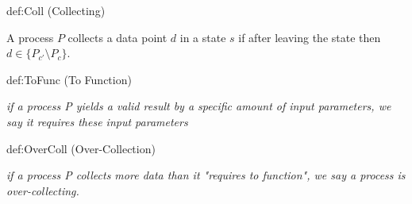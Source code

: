 

\begin{definition}{def:Coll}{}
(Collecting)

A process $P$ collects a data point $d$ in a state $s$ if after leaving the state then $d \in \{P_{c'} \setminus P_{c}\}$.

\end{definition}

\begin{definition}{def:ToFunc}{}
(To Function)

\textit{if a process P yields a valid result by a specific amount of input parameters, we say it requires these input parameters}
\end{definition}


\begin{definition}{def:OverColl}{} 
(Over-Collection)

\textit{if a process P collects more data than it "requires to function", we say a process is over-collecting.}
\end{definition} 


